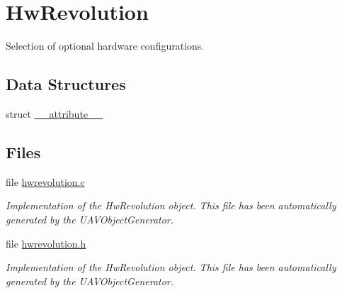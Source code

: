 \hypertarget{group___hw_revolution}{\section{\-Hw\-Revolution}
\label{group___hw_revolution}
}


\-Selection of optional hardware configurations.  


\subsection*{\-Data \-Structures}
\begin{DoxyCompactItemize}
\item 
struct \hyperlink{struct____attribute____}{\-\_\-\-\_\-attribute\-\_\-\-\_\-}
\end{DoxyCompactItemize}
\subsection*{\-Files}
\begin{DoxyCompactItemize}
\item 
file \hyperlink{hwrevolution_8c}{hwrevolution.\-c}
\begin{DoxyCompactList}\small\item\em \-Implementation of the \-Hw\-Revolution object. \-This file has been automatically generated by the \-U\-A\-V\-Object\-Generator. \end{DoxyCompactList}\item 
file \hyperlink{hwrevolution_8h}{hwrevolution.\-h}
\begin{DoxyCompactList}\small\item\em \-Implementation of the \-Hw\-Revolution object. \-This file has been automatically generated by the \-U\-A\-V\-Object\-Generator. \end{DoxyCompactList}\end{DoxyCompactItemize}
